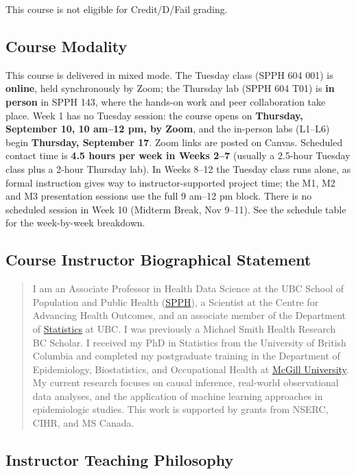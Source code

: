 \documentclass[
]{article}
\begin{document}
This course is not eligible for Credit/D/Fail grading.

\subsection{Course Modality}\label{course-modality}

This course is delivered in mixed mode. The Tuesday class (SPPH 604 001)
is \textbf{online}, held synchronously by Zoom; the Thursday lab (SPPH
604 T01) is \textbf{in person} in SPPH 143, where the hands-on work and
peer collaboration take place. Week 1 has no Tuesday session: the course
opens on \textbf{Thursday, September 10, 10 am--12 pm, by Zoom}, and the
in-person labs (L1--L6) begin \textbf{Thursday, September 17}. Zoom
links are posted on Canvas. Scheduled contact time is \textbf{4.5 hours
per week in Weeks 2--7} (usually a 2.5-hour Tuesday class plus a 2-hour
Thursday lab). In Weeks 8--12 the Tuesday class runs alone, as formal
instruction gives way to instructor-supported project time; the M1, M2
and M3 presentation sessions use the full 9 am--12 pm block. There is no
scheduled session in Week 10 (Midterm Break, Nov 9--11). See the
schedule table for the week-by-week breakdown.

\subsection{Course Instructor Biographical
Statement}\label{course-instructor-biographical-statement}

\begin{quote}
I am an Associate Professor in Health Data Science at the UBC School of
Population and Public Health
(\href{https://spph.ubc.ca/person/ehsan-karim/}{SPPH}), a Scientist at
the Centre for Advancing Health Outcomes, and an associate member of the
Department of \href{https://www.stat.ubc.ca/}{Statistics} at UBC. I was
previously a Michael Smith Health Research BC Scholar. I received my PhD
in Statistics from the University of British Columbia and completed my
postgraduate training in the Department of Epidemiology, Biostatistics,
and Occupational Health at
\href{https://www.mcgill.ca/epi-biostat-occh/}{McGill University}. My
current research focuses on causal inference, real-world observational
data analyses, and the application of machine learning approaches in
epidemiologic studies. This work is supported by grants from NSERC,
CIHR, and MS Canada.
\end{quote}

\subsection{Instructor Teaching
Philosophy}\label{instructor-teaching-philosophy}
\end{document}

